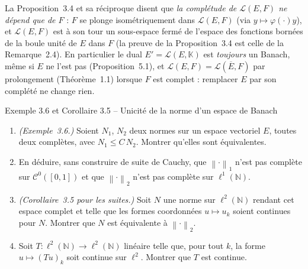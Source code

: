 \documentclass[11pt,a4paper]{article}
\newcommand{\N}{\mathbb{N}}
\newcommand{\K}{\mathbb{K}}
\newcommand{\adh}[1]{\overline{#1}}
\newcommand{\norm}[1]{\left\|#1\right\|}
\newcommand{\Lc}{\mathcal{L}}
\newcommand{\Cz}{\mathcal{C}^0}
\theoremstyle{definition}
\begin{document}
\begin{commentaire}
La Proposition~3.4 et sa réciproque disent que \emph{la complétude de $\Lc(E,F)$ ne dépend que de $F$} : $F$ se plonge isométriquement dans $\Lc(E,F)$ (via $y\mapsto\varphi(\cdot)y$), et $\Lc(E,F)$ est à son tour un sous-espace fermé de l'espace des fonctions bornées de la boule unité de $E$ dans $F$ (la preuve de la Proposition~3.4 est celle de la Remarque~2.4). En particulier le dual $E'=\Lc(E,\K)$ est \emph{toujours} un Banach, même si $E$ ne l'est pas (Proposition~5.1), et $\Lc(E,F)=\Lc(\adh E,F)$ par prolongement (Théorème~1.1) lorsque $F$ est complet : remplacer $E$ par son complété ne change rien.
\end{commentaire}

\begin{exo}{Exemple 3.6 et Corollaire 3.5 -- Unicité de la norme d'un espace de Banach}
\begin{enumerate}[label=(\alph*)]
  \item \emph{(Exemple~3.6.)} Soient $N_1$, $N_2$ deux normes sur un espace vectoriel $E$, toutes deux complètes, avec $N_1\le C\,N_2$. Montrer qu'elles sont équivalentes.
  \item En déduire, sans construire de suite de Cauchy, que $\norm\cdot_1$ n'est pas complète sur $\Cz([0,1])$ et que $\norm\cdot_2$ n'est pas complète sur $\ell^1(\N)$.
  \item \emph{(Corollaire~3.5 pour les suites.)} Soit $N$ une norme sur $\ell^2(\N)$ rendant cet espace complet et telle que les formes coordonnées $u\mapsto u_k$ soient continues pour $N$. Montrer que $N$ est équivalente à $\norm\cdot_2$.
  \item Soit $T:\ell^2(\N)\to\ell^2(\N)$ linéaire telle que, pour tout $k$, la forme $u\mapsto(Tu)_k$ soit continue sur $\ell^2$. Montrer que $T$ est continue.
\end{enumerate}
\end{exo}
\end{document}
